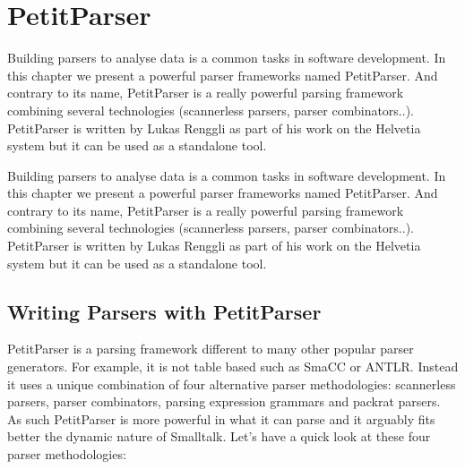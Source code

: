 \documentclass[a4paper,10pt,twoside]{book}
\begin{document}
\fi
\sloppy
\chapter{PetitParser}

\chapterauthor{\authorlukas{}}

\newcommand{\ppmthind}[1]{\clsmthind{PPParser}{#1}}

Building parsers to analyse data is a common tasks in software
development. In this chapter we present a powerful parser frameworks
named PetitParser. And contrary to its name, PetitParser is a really
powerful parsing framework combining several technologies (scannerless
parsers, parser combinators..). PetitParser is written by Lukas
Renggli as part of his work on the Helvetia system but it can be used
as a standalone tool.

Building parsers to analyse data is a common tasks in software
development. In this chapter we present a powerful parser frameworks
named PetitParser. And contrary to its name, PetitParser is a really
powerful parsing framework combining several technologies (scannerless
parsers, parser combinators..). PetitParser is written by Lukas
Renggli as part of his work on the Helvetia system but it can be used
as a standalone tool.

\section{Writing Parsers with PetitParser}

 PetitParser is a parsing framework different
to many other popular parser generators. For example, it is not table
based such as SmaCC or ANTLR. Instead it uses a unique combination of
four alternative parser methodologies: scannerless parsers, parser
combinators, parsing expression grammars and packrat parsers. As such
PetitParser is more powerful in what it can parse and it arguably fits
better the dynamic nature of Smalltalk. Let's have a quick look at
these four parser methodologies:
\end{document}
